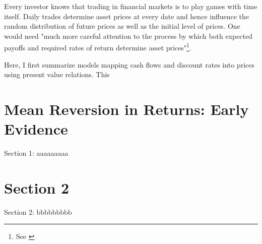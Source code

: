\minitoc

\vspace{0.5cm}
Every investor knows that trading in financial markets is to play
games with time itself. Daily trades determine asset prices at every date and hence
influence the random distribution of future prices as well as the initial
level of prices. One would need "much more careful attention to the process
by which both expected payoffs and required rates of return determine
asset prices"\footnote{See \cite[p.~121]{campbell2017financial}}.

Here, I first summarize models mapping cash flows and discount rates
into prices using present value relations. This 

\section{Mean Reversion in Returns: Early Evidence}
Section 1: aaaaaaaaa

\section{Section 2}
Section 2: bbbbbbbbb